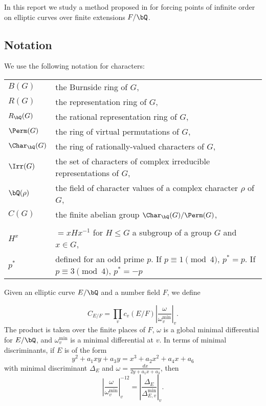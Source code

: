 In this report we study a method proposed in \cite{DEW1} for forcing points of infinite order on elliptic curves over finite extensions $F / \bQ$. 

\subsection*{Notation}
We use the following notation for characters:

\bigskip

\begin{tabular}{l | l}
    $B(G)$ & the Burnside ring of $G$, \\
    $R(G)$ & the representation ring of $G$, \\
    $R_{\bQ}(G)$ & the rational representation ring of $G$, \\
    $\Perm(G)$ & the ring of virtual permutations of $G$, \\
    $\Char_{\bQ}(G)$ & the ring of rationally-valued characters of $G$,\\
    $\Irr(G)$ & the set of characters of complex irreducible representations of $G$, \\
    $\bQ(\rho)$ & the field of character values of a complex character $\rho$ of $G$, \\
    $C(G)$ & the finite abelian group $\Char_{\bQ}(G) / \Perm(G)$, \\ 
    \\
    $H^{x}$ & $= xHx^{-1}$  for $H \leq G$ a subgroup of a group $G$ and $x \in G$,\\
    $p^*$ & defined for an odd prime $p$. If $p \equiv 1 \pmod 4$, $p^* = p$. If $p \equiv 3 \pmod 4$, $p^* = -p$
\end{tabular}
\vspace{2em}

Given an elliptic curve $E / \bQ$ and a number field $F$, we define

\[ C_{E / F} = \prod_v c_v(E / F) \left| \frac{\omega}{\omega_v^{\min}} \right|_v. \]
The product is taken over the finite places of $F$, $\omega$ is a global minimal differential for $E / \bQ$, and $\omega_v^{\min}$ is a minimal differential at $v$. In terms of minimal discriminants, if $E$ is of the form
\[ y^2 + a_1 x y + a_3 y = x^3 + a_2 x^2 + a_4 x + a_6 \]
with minimal discriminant $\Delta_E$ and $\omega = \frac{dx}{2 y + a_1 x + a_3}$, then
\[ \left| \frac{\omega}{\omega_v^{\min}} \right|_v^{-12} = \left| \frac{\Delta_E}{\Delta_{E, v}^{\min}} \right|_v . \]